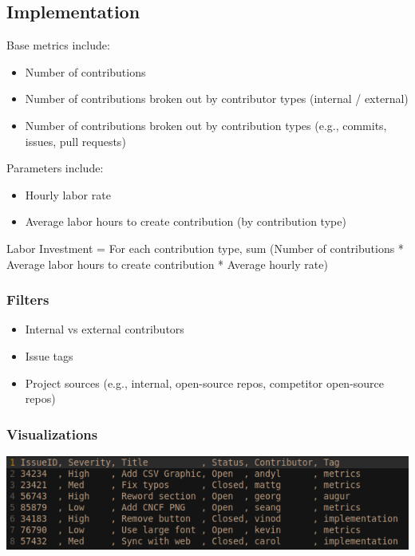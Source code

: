 \hypertarget{implementation}{%
\subsection{Implementation}\label{implementation}}

Base metrics include:

\begin{itemize}
\tightlist
\item
  Number of contributions
\item
  Number of contributions broken out by contributor types (internal /
  external)
\item
  Number of contributions broken out by contribution types (e.g.,
  commits, issues, pull requests)
\end{itemize}

Parameters include:

\begin{itemize}
\tightlist
\item
  Hourly labor rate
\item
  Average labor hours to create contribution (by contribution type)
\end{itemize}

Labor Investment = For each contribution type, sum (Number of
contributions * Average labor hours to create contribution * Average
hourly rate)

\hypertarget{filters}{%
\subsubsection{Filters}\label{filters}}

\begin{itemize}
\tightlist
\item
  Internal vs external contributors
\item
  Issue tags
\item
  Project sources (e.g., internal, open-source repos, competitor
  open-source repos)
\end{itemize}

\hypertarget{visualizations}{%
\subsubsection{Visualizations}\label{visualizations}}

\includegraphics{images/labor-investment_csv.png}

